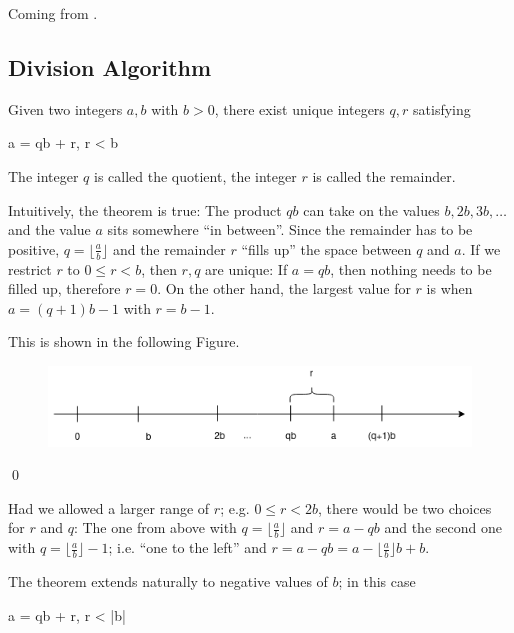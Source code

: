 
Coming from \cite{Burton2011}.

\subsection{Division Algorithm}

\begin{theorem}
  Given two integers $a,b$ with $b > 0$, there exist unique integers $q, r$ satisfying

  \bee
  a = qb + r,  \leq r < b
  \eee

  The integer $q$ is called the quotient, the integer $r$ is called the remainder.
\end{theorem}

Intuitively, the theorem is true: The product $qb$ can take on the values $b, 2b, 3b, \dots$ and the value $a$ sits somewhere ``in between''. Since the remainder has to be positive, $q = \lfloor \frac{a}{b} \rfloor$ and the remainder $r$ ``fills up'' the space between $q$ and $a$. If we restrict $r$ to $0 \leq r < b$, then $r,q$ are unique: If $a = qb$, then nothing needs to be filled up, therefore $r = 0$. On the other hand, the largest value for $r$ is when $a = (q+1)b-1$ with $r = b-1$.

This is shown in the following Figure.

\begin{figure}[H]
\centering
\includegraphics[scale=0.7]{images/division_stuff_1.png}
\end{figure}

\qed

Had we allowed a larger range of $r$; e.g. $0 \leq r < 2b$, there would be two choices for $r$ and $q$: The one from above with $q = \lfloor \frac{a}{b}\rfloor$ and $r = a - qb$ and the second one with $q = \lfloor \frac{a}{b}\rfloor - 1$; i.e. ``one to the left'' and $r = a - qb = a - \lfloor \frac{a}{b}\rfloor b + b$.

The theorem extends naturally to negative values of $b$; in this case

\bee
a = qb + r,  \leq r < |b|
\eee

